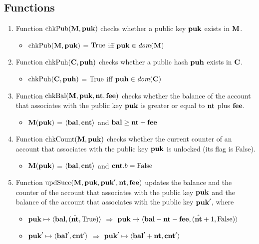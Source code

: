 \documentclass[a4paper]{llncs}
\begin{document}
\subsection{Functions}
\label{sec:functions}

\begin{enumerate}
    \item Function $\textup{chkPub}(\textbf{M}, \textbf{puk})$ checks whether a public key $\textbf{puk}$ exists in $\textbf{M}$.
    \begin{itemize}
    \item[] $\textup{chkPub}(\textbf{M}, \textbf{puk})$ = $\text{True}$ iff $\textbf{puk} \in \textit{dom}(\textbf{M})$
    \end{itemize}
    \item Function $\textup{chkPuh}(\textbf{C}, \textbf{puh})$ checks whether a public hash $\textbf{puh}$ exists in $\textbf{C}$.
     \begin{itemize}
    \item[] $\textup{chkPuh}(\textbf{C}, \textbf{puh})$ = $\text{True}$ iff $\textbf{puh} \in \textit{dom}(\textbf{C})$
    \end{itemize}
    \item Function $\textup{chkBal} (\textbf{M}, \textbf{puk}, \textbf{nt}, \textbf{fee})$ checks whether the balance of the account that associates with the public key $\textbf{puk}$ is greater or equal to $\textbf{nt}$ plus $\textbf{fee}$.
    \begin{itemize}
    \item[] $\textbf{M}(\textbf{puk})$ = $\langle\textbf{bal}, \textbf{cnt}\rangle$ and $\textbf{bal} \ge \textbf{nt} + \textbf{fee}$
    \end{itemize}
    \item Function $\textup{chkCount} (\textbf{M}, \textbf{puk})$ checks whether the current counter of an account that associates with the public key $\textbf{puk}$ is unlocked (its flag is False).
    \begin{itemize}
    \item[] $\textbf{M}(\textbf{puk})$ = $\langle\textbf{bal}, \textbf{cnt}\rangle$ and $\textbf{cnt}.b = \text{False}$
    \end{itemize}
    \item Function $\textup{updSucc}(\textbf{M}, \textbf{puk}, \textbf{puk}', \textbf{nt}, \textbf{fee})$ updates the balance and the counter of the account that associates with the public key $\textbf{puk}$ and the balance of the account that associates with the public key $\textbf{puk}'$, where
    \begin{itemize}
        \item[]  $\textbf{puk} \mapsto \langle\textbf{bal}, (\hat{\textbf{nt}}, \text{True})\rangle$ $\Rightarrow$ $ \textbf{puk} \mapsto \langle\textbf{bal} - \textbf{nt} - \textbf{fee}, (\hat{\textbf{nt}} + 1, \text{False})\rangle$     
        \item[] $\textbf{puk}' \mapsto \langle  \textbf{bal}', \textbf{cnt}' \rangle$ $\Rightarrow$ $\textbf{puk}' \mapsto \langle \textbf{bal}' + \textbf{nt}, \textbf{cnt}' \rangle $         
    \end{itemize}
    

\end{enumerate}
\end{document}
